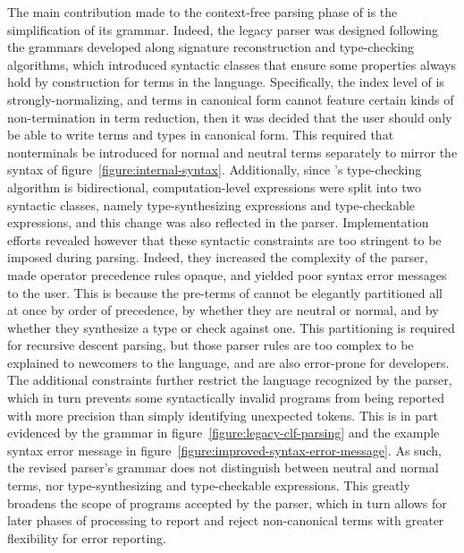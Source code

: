 The main contribution made to the context-free parsing phase of \Beluga is the simplification of its grammar.
Indeed, the legacy parser was designed following the grammars developed along signature reconstruction and type-checking algorithms, which introduced syntactic classes that ensure some properties always hold by construction for terms in the language.
Specifically, the index level \LF of \Beluga is strongly-normalizing, and \LF terms in canonical form cannot feature certain kinds of non-termination in term reduction, then it was decided that the user should only be able to write \LF terms and types in canonical form.
This required that nonterminals be introduced for normal and neutral terms separately to mirror the syntax of figure~\ref{figure:internal-syntax}.
Additionally, since \Beluga's type-checking algorithm is bidirectional, computation-level expressions were split into two syntactic classes, namely type-synthesizing expressions and type-checkable expressions, and this change was also reflected in the parser.
Implementation efforts revealed however that these syntactic constraints are too stringent to be imposed during parsing.
Indeed, they increased the complexity of the parser, made operator precedence rules opaque, and yielded poor syntax error messages to the user.
This is because the pre-terms of \Beluga cannot be elegantly partitioned all at once by order of precedence, by whether they are neutral or normal, and by whether they synthesize a type or check against one.
This partitioning is required for recursive descent parsing, but those parser rules are too complex to be explained to newcomers to the language, and are also error-prone for developers.
The additional constraints further restrict the language recognized by the parser, which in turn prevents some syntactically invalid programs from being reported with more precision than simply identifying unexpected tokens.
This is in part evidenced by the grammar in figure~\ref{figure:legacy-clf-parsing} and the example syntax error message in figure~\ref{figure:improved-syntax-error-message}.
As such, the revised parser's grammar does not distinguish between neutral and normal terms, nor type-synthesizing and type-checkable expressions.
This greatly broadens the scope of programs accepted by the parser, which in turn allows for later phases of processing to report and reject non-canonical terms with greater flexibility for error reporting.

